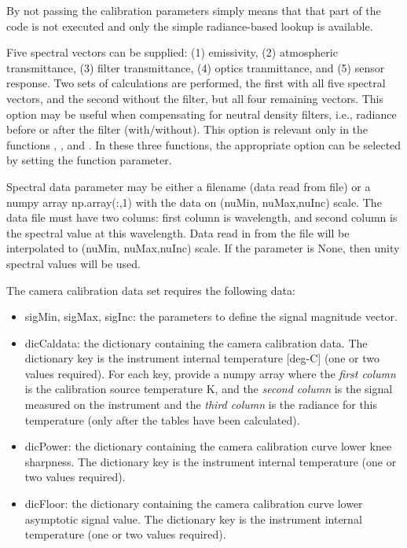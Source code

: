 \documentclass[a4paper,10pt,english]{sphinxmanual}
\begin{document}
\begin{fulllineitems}
\begin{itemize}
\end{itemize}

By not passing the calibration parameters simply means that that part of the code is
not executed and only the simple radiance-based lookup is available.

Five spectral vectors can be supplied:
(1) emissivity,
(2) atmospheric transmittance,
(3) filter transmittance,
(4) optics tranmittance, and
(5) sensor response.
Two sets of calculations are performed, the first with all five spectral vectors,
and the second without the filter, but all four remaining vectors.  This option
may be useful when compensating for neutral density filters, i.e., radiance before
or after the filter (with/without).  This option is relevant only in the
functions , , and . In these three
functions, the appropriate option can be selected by setting the 
function parameter.

Spectral data parameter may be either a filename (data read from file) or a
numpy array np.array(:,1) with the data on (nuMin, nuMax,nuInc) scale.  The data file
must have two colums: first column is wavelength, and second
column is the spectral value at this wavelength.  Data read in from the file
will be interpolated to (nuMin, nuMax,nuInc) scale. If the parameter is None,
then unity spectral values will be used.

The camera calibration data set requires the following data:
\begin{itemize}
\item {} 
sigMin, sigMax, sigInc: the parameters to define the signal magnitude vector.

\item {} 
dicCaldata:  the dictionary containing the camera calibration data.  The dictionary
key is the instrument internal temperature {[}deg-C{]} (one or two values required).
For each key, provide a numpy array where the \emph{first column} is the calibration
source temperature K, and the \emph{second column} is the signal measured on
the instrument and the \emph{third column} is the radiance for this temperature
(only after the tables have been calculated).

\item {} 
dicPower: the dictionary containing the camera calibration curve lower knee
sharpness.  The dictionary key is the instrument internal temperature
(one or two values required).

\item {} 
dicFloor: the dictionary containing the camera calibration curve lower asymptotic
signal value.  The dictionary key is the instrument internal temperature
(one or two values required).


\end{itemize}
\end{fulllineitems}
\end{document}
